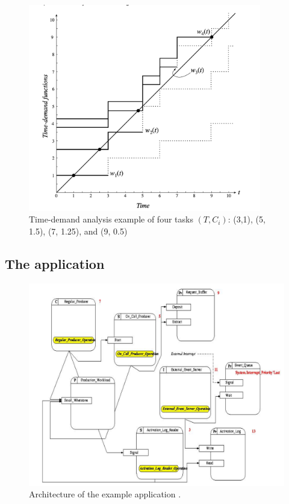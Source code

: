 \documentclass{article}
\begin{document}
\begin{figure}[!htbp]
\centering
\includegraphics[width=4in]{images/time-demand}
\caption{Time-demand analysis example of four tasks $(T, C_i)$: (3,1), (5, 1.5), (7, 1.25), and (9, 0.5)}
\label{time-demand}
\end{figure}

\subsection{The application}\label{the-application}

\begin{figure}[!htbp]
\centering
\includegraphics[width=5in]{images/ycs}
\caption{Architecture of the example application \cite{ycs}.}
\label{ycs}
\end{figure}
\end{document}
